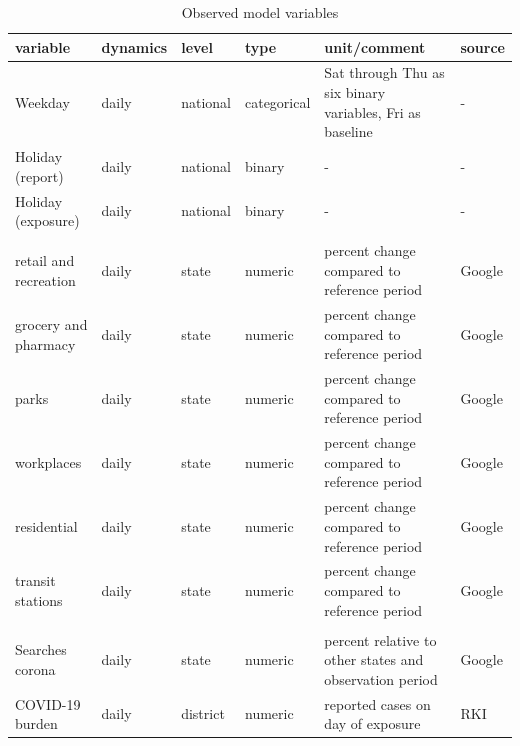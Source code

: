 \documentclass[]{elsarticle} %
\begin{document}
\begin{table}

\caption{\label{tab:model-vars}Observed model variables}
\centering
\fontsize{6}{8}\selectfont
\begin{tabular}[t]{llll>{\raggedright\arraybackslash}p{10em}l}
\toprule
variable & dynamics & level & type & unit/comment & source\\
\midrule
Weekday & daily & national & categorical & Sat through Thu as six binary variables, Fri as baseline & -\\
Holiday (report) & daily & national & binary & - & -\\
Holiday (exposure) & daily & national & binary & - & -\\
\addlinespace[0.3em]
\multicolumn{6}{l}{\textbf{Mobility}}\\
\hspace{1em}retail and recreation & daily & state & numeric & percent change compared to reference period & Google \citep{google_mobility}\\
\hspace{1em}grocery and pharmacy & daily & state & numeric & percent change compared to reference period & Google \citep{google_mobility}\\
\hspace{1em}parks & daily & state & numeric & percent change compared to reference period & Google \citep{google_mobility}\\
\hspace{1em}workplaces & daily & state & numeric & percent change compared to reference period & Google \citep{google_mobility}\\
\hspace{1em}residential & daily & state & numeric & percent change compared to reference period & Google \citep{google_mobility}\\
\hspace{1em}transit stations & daily & state & numeric & percent change compared to reference period & Google \citep{google_mobility}\\
\addlinespace[0.3em]
\multicolumn{6}{l}{\textbf{Awareness}}\\
\hspace{1em}Searches corona & daily & state & numeric & percent relative to other states and observation period & Google \citep{google_trends}\\
\hspace{1em}COVID-19 burden & daily & district & numeric & reported cases on day of exposure & RKI \citep{casenumbers_rki}\\

\end{tabular}
\end{table}
\end{document}
